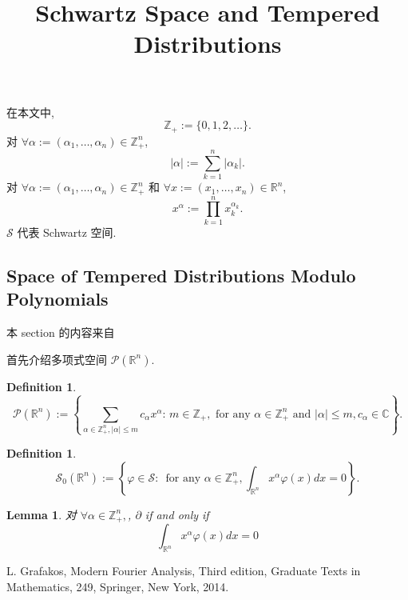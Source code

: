 \documentclass[a4paper,12pt]{article}
\title{Schwartz Space and Tempered Distributions}
\newtheorem{lemma}[theorem]{Lemma}
\theoremstyle{definition}
\newtheorem{definition}[theorem]{Definition}
\begin{document}
\begin{CJK*}{UTF8}{gbsn}

\maketitle

在本文中, 
$$ 
    \mathbb{Z}_+ := \{0, 1, 2, \ldots\}.
$$
对 $ \forall \alpha := (\alpha_1, \ldots, \alpha_n) \in \mathbb{Z}_+^n $,
$$
    |\alpha| := \sum_{k = 1}^n |\alpha_k|.
$$
对 $ \forall \alpha := (\alpha_1, \ldots, \alpha_n) \in \mathbb{Z}_+^n $ 
和 $ \forall x := (x_1, \ldots, x_n) \in \mathbb{R}^n $,
$$
    x^\alpha := \prod_{k = 1}^n x_k^{\alpha_k}.
$$ 
$ \mathcal{S} $ 代表 Schwartz 空间.

\subsection{Space of Tempered Distributions Modulo Polynomials}

本 section 的内容来自 \cite[1.1.1]{g14}

首先介绍多项式空间 $ \mathcal{P}(\mathbb{R}^n) $.
\begin{definition}
    $$
        \mathcal{P}(\mathbb{R}^n) 
            := \left\{ \sum_{\alpha \in \mathbb{Z}_+^n, |\alpha| \leq m} c_\alpha x^{\alpha} :\,
                 m \in \mathbb{Z}_+, \text{ for any } \alpha \in \mathbb{Z}_+^n \text{ and } |\alpha| \leq m, c_\alpha \in \mathbb{C} \right\}.
    $$
\end{definition} 

\begin{definition}
    $$
        \mathcal{S}_0(\mathbb{R}^n) 
            := \left\{ \varphi \in \mathcal{S} :\,
                 \text{ for any } \alpha \in \mathbb{Z}_+^n, \int_{\mathbb{R}^n} x^\alpha \varphi(x) dx = 0 \right\}.
    $$
\end{definition} 

\begin{lemma}
    对 $ \forall \alpha \in \mathbb{Z}_+^n, $, $ \partial $ if and only if
    $$
        \int_{\mathbb{R}^n} x^\alpha \varphi(x) dx = 0
    $$
\end{lemma}

\begin{thebibliography}{99}
    
     L. Grafakos, Modern Fourier Analysis, Third edition, 
    Graduate Texts in Mathematics, 249, Springer, New York, 2014.
    
\end{thebibliography}

\end{CJK*}
\end{document}
